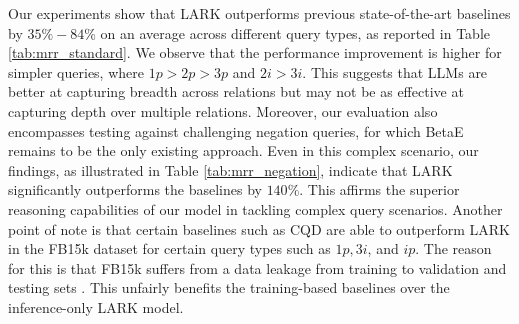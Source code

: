 \documentclass{article} %
\newcommand{\model}{LARK}
\begin{document}
Our experiments show that {\model} outperforms previous state-of-the-art baselines by $35\%-84\%$ on an average across different query types, as reported in Table \ref{tab:mrr_standard}. We observe that the performance improvement is higher for simpler queries, where $1p>2p>3p$ and $2i>3i$. This suggests that LLMs are better at capturing breadth across relations but may not be as effective at capturing depth over multiple relations. {Moreover, our evaluation also encompasses testing against challenging negation queries, for which BetaE \citep{ren2020beta} remains to be the only existing approach. Even in this complex scenario, our findings, as illustrated in Table \ref{tab:mrr_negation}, indicate that {\model} significantly outperforms the baselines by $140\%$. This affirms the superior reasoning capabilities of our model in tackling complex query scenarios. Another point of note is that certain baselines such as CQD are able to outperform {\model} in the FB15k dataset for certain query types such as $1p, 3i$, and $ip$. The reason for this is that FB15k suffers from a data leakage from training to validation and testing sets \citep{toutanova2015representing}. This unfairly benefits the training-based baselines over the inference-only {\model} model.}
\end{document}
